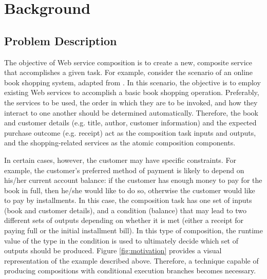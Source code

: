 \documentclass[conference]{IEEEtran}
\begin{document}
\section{Background}\label{background}

\subsection{Problem Description}\label{motivation}
The objective of Web service composition is to create a new, composite service that accomplishes a given task. For example, consider the scenario of an online book shopping system, adapted from \cite{wang2014automated}. In this scenario, the objective is to employ existing Web services to accomplish a basic book shopping operation. Preferably, the services to be used, the order in which they are to be invoked, and how they interact to one another should be determined automatically. Therefore, the 
book and customer details (e.g. title, author, customer information) and the expected purchase outcome (e.g. receipt) act as the 
composition task inputs and outputs, and the shopping-related services as the atomic composition components.

In certain cases, however, the customer may have specific constraints. For example, the customer's preferred method of payment is likely to depend on his/her current account
balance: if the customer has enough money to pay for the book in full, then he/she would like to do so, otherwise the customer would like to pay by installments.
In this case, the composition task has one set of inputs (book and customer details), and a condition (balance) that may lead to two different sets of outputs depending on whether it is met (either a receipt for paying full or the initial installment bill). In this type of composition, the runtime value of the type in the condition is used to ultimately decide which set of outputs should be produced. Figure \ref{fig:motivation} provides a visual representation of the example described above. Therefore, a technique capable of producing compositions with conditional execution branches becomes necessary.
\end{document}
